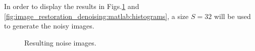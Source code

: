 In order to display the results in Figs.\ref{fig:image_restoration_denoising:matlab:noises} and \ref{fig:image_restoration_denoising:matlab:histograms}, a size $S=32$ will be used to generate the noisy images.
\begin{figure}[htbp]
 \centering
 
 \hspace{1cm}
 
   \hspace{1cm}

 \caption{Resulting noise images.}
 \label{fig:image_restoration_denoising:matlab:noises}
\end{figure}

